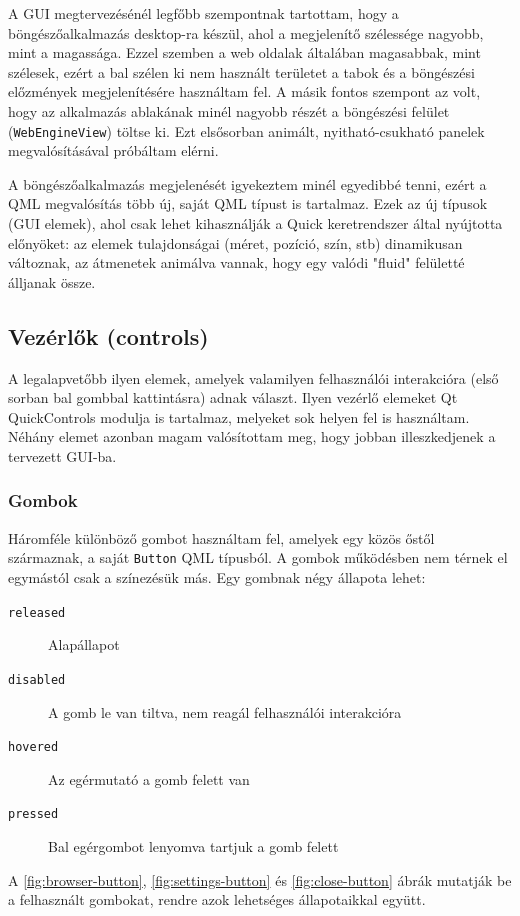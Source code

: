 \documentclass[12pt]{report}
\begin{document}
A GUI megtervezésénél legfőbb szempontnak tartottam, hogy a böngészőalkalmazás desktop-ra
készül, ahol a megjelenítő szélessége nagyobb, mint a magassága. Ezzel szemben a web oldalak
általában magasabbak, mint szélesek, ezért a bal szélen ki nem használt területet a tabok
és a böngészési előzmények megjelenítésére használtam fel. A másik fontos szempont az volt,
hogy az alkalmazás ablakának minél nagyobb részét a böngészési felület
(\texttt{WebEngineView}) töltse ki. Ezt elsősorban animált, nyitható-csukható panelek
megvalósításával próbáltam elérni.

A böngészőalkalmazás megjelenését igyekeztem minél egyedibbé tenni, ezért a QML megvalósítás
több új, saját QML típust is tartalmaz. Ezek az új típusok (GUI elemek), ahol csak lehet
kihasználják a Quick keretrendszer által nyújtotta előnyöket: az elemek tulajdonságai
(méret, pozíció, szín, stb) dinamikusan változnak, az átmenetek animálva vannak, hogy
egy valódi "fluid" felületté álljanak össze.

\subsection{Vezérlők (controls)}
A legalapvetőbb ilyen elemek, amelyek valamilyen felhasználói interakcióra (első sorban
bal gombbal kattintásra) adnak választ. Ilyen vezérlő elemeket Qt QuickControls modulja
is tartalmaz, melyeket sok helyen fel is használtam. Néhány elemet azonban magam valósítottam
meg, hogy jobban illeszkedjenek a tervezett GUI-ba.

\subsubsection{Gombok}
Háromféle különböző gombot használtam fel, amelyek egy közös őstől származnak,
a saját \texttt{Button} QML típusból. A gombok működésben nem térnek el egymástól csak a
színezésük más. Egy gombnak négy állapota lehet:
\begin{description}
    \item[\texttt{released}] Alapállapot
    \item[\texttt{disabled}] A gomb le van tiltva, nem reagál felhasználói interakcióra
    \item[\texttt{hovered}] Az egérmutató a gomb felett van
    \item[\texttt{pressed}] Bal egérgombot lenyomva tartjuk a gomb felett
\end{description}

A \ref{fig:browser-button}, \ref{fig:settings-button} és \ref{fig:close-button} ábrák
mutatják be a felhasznált gombokat, rendre azok lehetséges állapotaikkal együtt.
\end{document}
